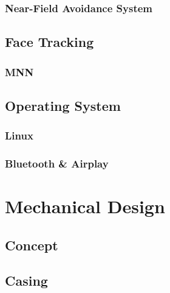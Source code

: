 \subsubsection{Near-Field Avoidance System} \label{4_Sensors_Near-field}

\subsection{Face Tracking}
\subsubsection{MNN}
\subsection{Operating System}
\subsubsection{Linux}
\subsubsection{Bluetooth \& Airplay}


\section{Mechanical Design}
\subsection{Concept}
\subsection{Casing}
\newpage
